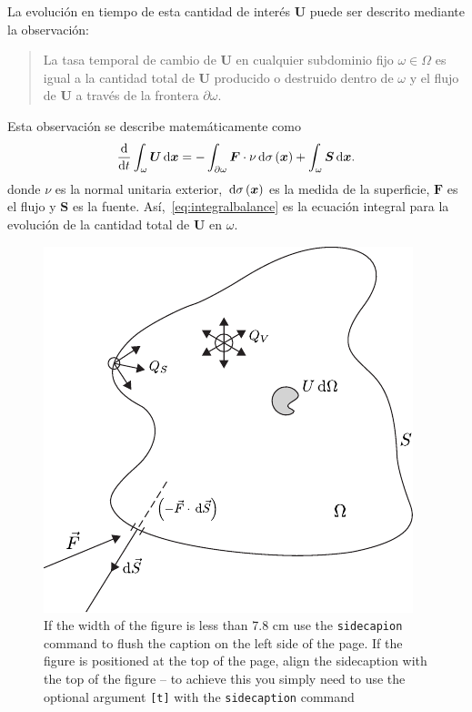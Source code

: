 La evolución en tiempo de esta cantidad de interés $\bm{U}$
puede ser descrito mediante la observación:
\begin{quote}
    La tasa temporal de cambio de $\bm{U}$ en cualquier subdominio
    fijo $\omega\in\Omega$ es igual a la cantidad total de
    $\bm{U}$ producido o destruido dentro de $\omega$ y el flujo
    de $\bm{U}$ a través de la frontera $\partial\omega$.
\end{quote}
Esta observación se describe matemáticamente como
\begin{equation}\label{eq:integralbalance}
    \diff{}{t}
    \int_{\omega}
    \bm{U}\dl{\bm{x}}=
    -\int_{\partial\omega}
    \bm{F}\cdot\nu\dl{\sigma\left(\bm{x}\right)}+
    \int_{\omega}
    \bm{S}\dl{\bm{x}}.
\end{equation}
donde $\nu$ es la normal unitaria exterior,
$\dl{\sigma\left(\bm{x}\right)}$ es la medida de la superficie,
$\bm{F}$ es el flujo y $\bm{S}$ es la fuente.
Así,~\eqref{eq:integralbalance} es la ecuación integral para la
evolución de la cantidad total de $\bm{U}$ en $\omega$.
\begin{figure}[b]
    \sidecaption
    \includegraphics{conservationscheme}
    \caption{If the width of the figure is less than 7.8 cm use the
        \texttt{sidecapion} command to flush the caption on the left side of the page.
        If the figure is positioned at the top of the page, align the sidecaption with
        the top of the figure -- to achieve this you simply need to use the optional
        argument \texttt{[t]} with the \texttt{sidecaption} command}
    \label{fig:1}       %
\end{figure}
